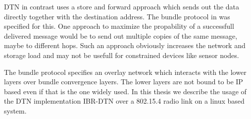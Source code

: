 DTN in contrast uses a store and forward approach which sends out the data
directly together with the destination address. The bundle protocol in
\cite{RFC5050} was specified for this. One approach to maximize the propability
of a successfull delivered message would be to send out multiple copies of the
same message, maybe to different hops. Such an approach obviously increases the
network and storage load and may not be usefull for constrained devices like
sensor nodes.

The bundle protocol specifies an overlay network which interacts with the lower
layers over bundle convergence layers. The lower layers are not bound to be IP
based even if that is the one widely used. In this thesis we describe the usage
of the DTN implementation IBR-DTN over a 802.15.4 radio link on a linux based
system.

